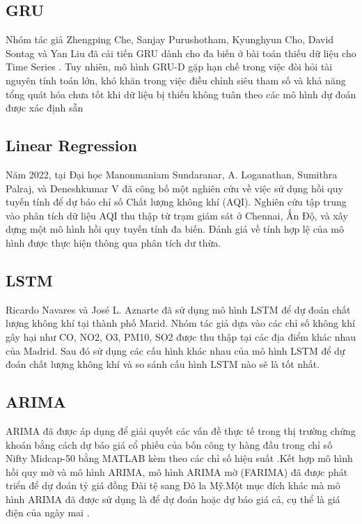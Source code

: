 \documentclass[conference]{IEEEtran}
\begin{document}
\subsection{GRU}
Nhóm tác giả Zhengping Che, Sanjay Purushotham, Kyunghyun Cho, David Sontag và Yan Liu đã cải tiến GRU dành cho đa biến ở bài toán thiếu dữ liệu cho Time Series \cite{che2016recurrent}. Tuy nhiên, mô hình GRU-D gặp hạn chế trong việc đòi hỏi tài nguyên tính toán lớn, khó khăn trong việc điều chỉnh siêu tham số và khả năng tổng quát hóa chưa tốt khi dữ liệu bị thiếu không tuân theo các mô hình dự đoán được xác định sẵn

\subsection{Linear Regression}
Năm 2022, tại Đại học Manonmaniam Sundaranar, A. Loganathan, Sumithra Palraj, và Deneshkumar V đã công bố một nghiên cứu về việc sử dụng hồi quy tuyến tính để dự báo chỉ số Chất lượng không khí (AQI). Nghiên cứu tập trung vào phân tích dữ liệu AQI thu thập từ trạm giám sát ở Chennai, Ấn Độ, và xây dựng một mô hình hồi quy tuyến tính đa biến. Đánh giá về tính hợp lệ của mô hình được thực hiện thông qua phân tích dư thừa. \cite{b18}

\subsection{LSTM}
Ricardo Navares và José L. Aznarte đã sử dụng mô hình LSTM để dự đoán chất lượng không khí tại thành phố Marid. Nhóm tác giả dựa vào các chỉ số không khí gây hại như CO, NO2, O3, PM10, SO2 được thu thập tại các địa điểm khác nhau của Madrid. Sau đó sử dụng các cấu hình khác nhau của mô hình LSTM để dự đoán chất lượng không khí và so sánh cấu hình LSTM nào sẽ là tốt nhất. \cite{b12}

\subsection{ARIMA}
ARIMA đã được áp dụng để giải quyết các vấn đề thực tế trong thị trường chứng khoán bằng cách dự báo giá cổ phiếu của bốn công ty hàng đầu trong chỉ số Nifty Midcap-50 bằng MATLAB kèm theo các chỉ số hiệu suất \cite{b14} .Kết hợp mô hình hồi quy mờ và mô hình ARIMA, mô hình ARIMA mờ (FARIMA) đã được phát triển để dự đoán tỷ giá đồng Đài tệ sang Đô la Mỹ\cite{b15}.Một mục đích khác mà mô hình ARIMA đã được sử dụng là để dự đoán hoặc dự báo giá cả, cụ thể là giá điện của ngày mai \cite{b16} .
\end{document}

